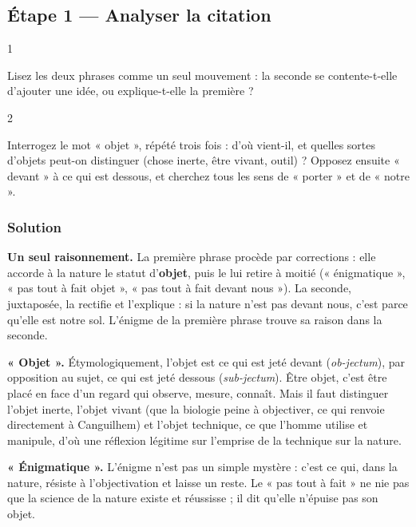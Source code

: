 \documentclass[11pt,a4paper]{article}
\begin{document}
\hypertarget{uxe9tape-1-analyser-la-citation}{%
\subsection{Étape 1 --- Analyser la citation}\label{uxe9tape-1-analyser-la-citation}}

\begin{indication}{1}

Lisez les deux phrases comme un seul mouvement : la seconde se contente-t-elle d'ajouter une idée, ou explique-t-elle la première ?

\end{indication}

\begin{indication}{2}

Interrogez le mot « objet », répété trois fois : d'où vient-il, et quelles sortes d'objets peut-on distinguer (chose inerte, être vivant, outil) ? Opposez ensuite « devant » à ce qui est dessous, et cherchez tous les sens de « porter » et de « notre ».

\end{indication}

\hypertarget{solution}{%
\subsubsection{Solution}\label{solution}}

\textbf{Un seul raisonnement.} La première phrase procède par corrections : elle accorde à la nature le statut d'\textbf{objet}, puis le lui retire à moitié (« énigmatique », « pas tout à fait objet », « pas tout à fait devant nous »). La seconde, juxtaposée, la rectifie et l'explique : si la nature n'est pas devant nous, c'est parce qu'elle est notre sol. L'énigme de la première phrase trouve sa raison dans la seconde.

\textbf{« Objet ».} Étymologiquement, l'objet est ce qui est jeté devant (\emph{ob-jectum}), par opposition au sujet, ce qui est jeté dessous (\emph{sub-jectum}). Être objet, c'est être placé en face d'un regard qui observe, mesure, connaît. Mais il faut distinguer l'objet inerte, l'objet vivant (que la biologie peine à objectiver, ce qui renvoie directement à Canguilhem) et l'objet technique, ce que l'homme utilise et manipule, d'où une réflexion légitime sur l'emprise de la technique sur la nature.

\textbf{« Énigmatique ».} L'énigme n'est pas un simple mystère : c'est ce qui, dans la nature, résiste à l'objectivation et laisse un reste. Le « pas tout à fait » ne nie pas que la science de la nature existe et réussisse ; il dit qu'elle n'épuise pas son objet.
\end{document}
